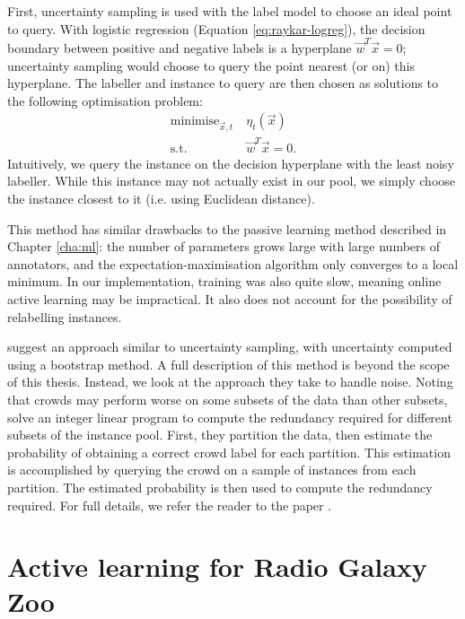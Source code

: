     First, uncertainty sampling is used with the label model to choose an ideal
    point to query. With logistic regression (Equation \ref{eq:raykar-logreg}),
    the decision boundary between positive and negative labels is a hyperplane
    $\vec w^T \vec x = 0$; uncertainty sampling would choose to query the point
    nearest (or on) this hyperplane. The labeller and instance to query are then
    chosen as solutions to the following optimisation problem:
    \begin{align*}
        \text{minimise}_{\vec x, t}\ & \eta_t(\vec x)\\
        \text{s.t. } & \vec w^T \vec x = 0.
    \end{align*}
    Intuitively, we query the instance on the decision hyperplane with the least
    noisy labeller. While this instance may not actually exist in our pool, we
    simply choose the instance closest to it (i.e. using Euclidean distance).

    This method has similar drawbacks to the \citeauthor{yan10} passive learning
    method described in Chapter \ref{cha:ml}: the number of parameters grows
    large with large numbers of annotators, and the expectation-maximisation
    algorithm only converges to a local minimum. In our implementation, training
    was also quite slow, meaning online active learning may be impractical. It
    also does not account for the possibility of relabelling instances.

    \citet{mozafari12} suggest an approach similar to uncertainty sampling, with
    uncertainty computed using a bootstrap method. A full description of this
    method is beyond the scope of this thesis. Instead, we look at the approach
    they take to handle noise. Noting that crowds may perform worse on some
    subsets of the data than other subsets, \citeauthor{mozafari12} solve an
    integer linear program to compute the redundancy required for different
    subsets of the instance pool. First, they partition the data, then estimate
    the probability of obtaining a correct crowd label for each partition. This
    estimation is accomplished by querying the crowd on a sample of instances
    from each partition. The estimated probability is then used to compute the
    redundancy required. For full details, we refer the reader to the paper
    \citep{mozafari12}.

\section{Active learning for Radio Galaxy Zoo}
\label{sec:ideal-experiment}
    
